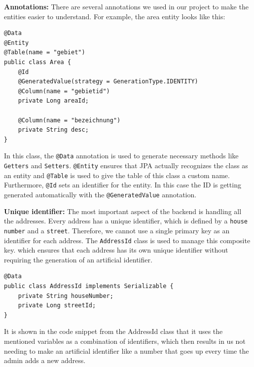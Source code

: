     \textbf{Annotations:} \newline
    There are several annotations we used in our project to make the entities easier to understand. For example, the area entity looks like this:  
    \lstset{style=mycsharp, caption=Area Entity}
    \begin{lstlisting}
@Data
@Entity
@Table(name = "gebiet")
public class Area {
    @Id
    @GeneratedValue(strategy = GenerationType.IDENTITY)
    @Column(name = "gebietid")
    private Long areaId;
        
    @Column(name = "bezeichnung")
    private String desc;
}                  
    \end{lstlisting} 

    In this class, the \texttt{@Data} annotation is used to generate necessary methods like \texttt{Getters} and \texttt{Setters}. \texttt{@Entity} ensures that JPA actually recognizes the class as an entity and \texttt{@Table} is used to give the table of this class a custom name. Furthermore, \texttt{@Id} sets an identifier for the entity. In this case the ID is getting generated automatically with the \texttt{@GeneratedValue} annotation. \newline
    
    \textbf{Unique identifier:} \newline
    The most important aspect of the backend is handling all the addresses. Every address has a unique identifier, which is defined by a \texttt{house number} and a \texttt{street}. Therefore, we cannot use a single primary key as an identifier for each address. \newline
    The \texttt{AddressId} class is used to manage this composite key. which ensures that each address has its own unique identifier without requiring the generation of an artificial identifier.
    \lstset{style=mycsharp, caption=AddressId}
    \begin{lstlisting}
@Data
public class AddressId implements Serializable { 
    private String houseNumber;
    private Long streetId;
}                         
    \end{lstlisting} 
    It is shown in the code snippet from the AddressId class that it uses the mentioned variables as a combination of identifiers, which then results in us not needing to make an artificial identifier like a number that goes up every time the admin adds a new address. \newline

